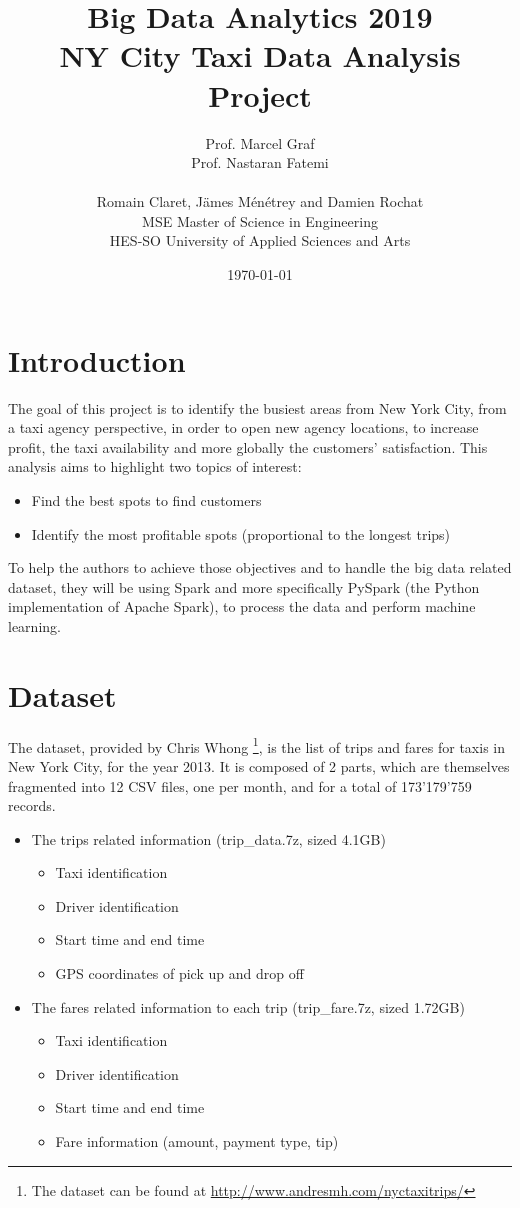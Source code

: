 \documentclass[a4paper]{article}
\title{
\Large{Big Data Analytics 2019}\\
\huge{NY City Taxi Data Analysis}\\
\large{Project}}
\author{
Prof. Marcel Graf\\
Prof. Nastaran Fatemi\\
\\
Romain Claret, Jämes Ménétrey and Damien Rochat\\
MSE Master of Science in Engineering\\
HES-SO University of Applied Sciences and Arts
\date{\today}}
\begin{document}
\maketitle

\tableofcontents
\clearpage

\section{Introduction}
The goal of this project is to identify the busiest areas from New York City, from a taxi agency perspective, in order to open new agency locations, to increase profit, the taxi availability and more globally the customers' satisfaction. This analysis aims to highlight two topics of interest:

\begin{itemize}
    \item Find the best spots to find customers
    \item Identify the most profitable spots (proportional to the longest trips)
\end{itemize}

To help the authors to achieve those objectives and to handle the big data related dataset, they will be using Spark and more specifically PySpark (the Python implementation of Apache Spark), to process the data and perform machine learning.


\section{Dataset}
The dataset, provided by Chris Whong \footnote{The dataset can be found at \url{http://www.andresmh.com/nyctaxitrips/}}, is the list of trips and fares for taxis in New York City, for the year 2013. It is composed of 2 parts, which are themselves fragmented into 12 CSV files, one per month, and for a total of 173'179'759 records.

\begin{itemize}
    \item The trips related information (trip\_data.7z, sized 4.1GB)
    \begin{itemize}
        \item Taxi identification
        \item Driver identification
        \item Start time and end time
        \item GPS coordinates of pick up and drop off
    \end{itemize}
    \item The fares related information to each trip (trip\_fare.7z, sized 1.72GB)
    \begin{itemize}
        \item Taxi identification
        \item Driver identification
        \item Start time and end time
        \item Fare information (amount, payment type, tip)
    \end{itemize}
\end{itemize}
\end{document}
